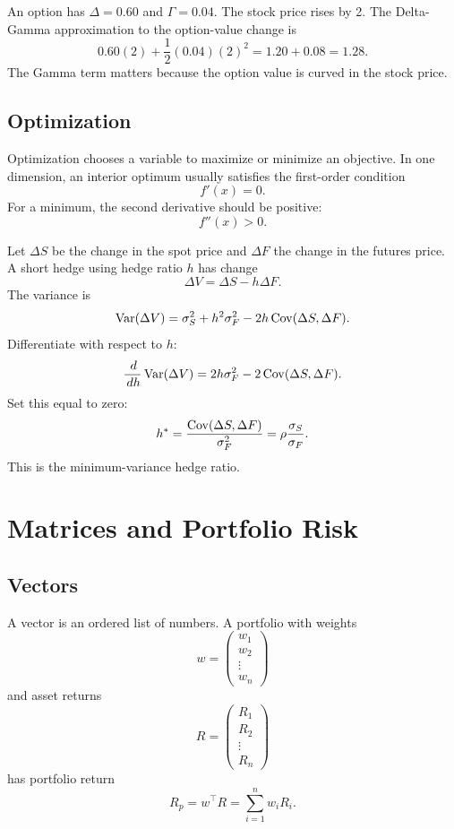 \begin{exmp}
An option has $\Delta=0.60$ and $\Gamma=0.04$. The stock price rises by 2. The
Delta-Gamma approximation to the option-value change is
\[
    0.60(2)+\frac{1}{2}(0.04)(2)^2
    =
    1.20+0.08
    =
    1.28.
\]
The Gamma term matters because the option value is curved in the stock price.
\end{exmp}

\subsection{Optimization}

Optimization chooses a variable to maximize or minimize an objective. In one
dimension, an interior optimum usually satisfies the first-order condition
\[
    f'(x)=0.
\]
For a minimum, the second derivative should be positive:
\[
    f''(x)>0.
\]

\begin{exmp}
Let $\Delta S$ be the change in the spot price and $\Delta F$ the change in the
futures price. A short hedge using hedge ratio $h$ has change
\[
    \Delta V=\Delta S-h\Delta F.
\]
The variance is
\[
    \operatorname{Var}(\Delta V)
    =
    \sigma_S^2+h^2\sigma_F^2-2h\operatorname{Cov}(\Delta S,\Delta F).
\]
Differentiate with respect to $h$:
\[
    \frac{\,d}{\,d h}\operatorname{Var}(\Delta V)
    =
    2h\sigma_F^2-2\operatorname{Cov}(\Delta S,\Delta F).
\]
Set this equal to zero:
\[
    h^*
    =
    \frac{\operatorname{Cov}(\Delta S,\Delta F)}{\sigma_F^2}
    =
    \rho\frac{\sigma_S}{\sigma_F}.
\]
This is the minimum-variance hedge ratio.
\end{exmp}

\section{Matrices and Portfolio Risk}

\subsection{Vectors}

A vector is an ordered list of numbers. A portfolio with weights
\[
    w=
    \begin{pmatrix}
    w_1\\
    w_2\\
    \vdots\\
    w_n
    \end{pmatrix}
\]
and asset returns
\[
    R=
    \begin{pmatrix}
    R_1\\
    R_2\\
    \vdots\\
    R_n
    \end{pmatrix}
\]
has portfolio return
\[
    R_p=w^\top R=\sum_{i=1}^{n}w_i R_i.
\]


